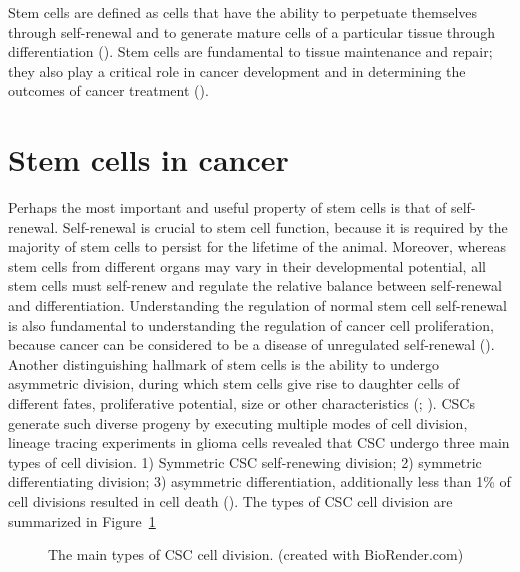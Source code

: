 \documentclass[
  letterpaper,
]{scrreprt}
\theoremstyle{definition}
\theoremstyle{remark}
\begin{document}
Stem cells are defined as cells that have the ability to perpetuate
themselves through self-renewal and to generate mature cells of a
particular tissue through differentiation (). Stem cells are fundamental to tissue maintenance and
repair; they also play a critical role in cancer development and in
determining the outcomes of cancer treatment
().

\section{Stem cells in cancer}\label{sec-stem-cells-in-cancer}

Perhaps the most important and useful property of stem cells is that of
self-renewal. Self-renewal is crucial to stem cell function, because it
is required by the majority of stem cells to persist for the lifetime of
the animal. Moreover, whereas stem cells from different organs may vary
in their developmental potential, all stem cells must self-renew and
regulate the relative balance between self-renewal and differentiation.
Understanding the regulation of normal stem cell self-renewal is also
fundamental to understanding the regulation of cancer cell
proliferation, because cancer can be considered to be a disease of
unregulated self-renewal ().
Another distinguishing hallmark of stem cells is the ability to undergo
asymmetric division, during which stem cells give rise to daughter cells
of different fates, proliferative potential, size or other
characteristics (;
). CSCs generate such
diverse progeny by executing multiple modes of cell division, lineage
tracing experiments in glioma cells revealed that CSC undergo three main
types of cell division. 1) Symmetric CSC self-renewing division; 2)
symmetric differentiating division; 3) asymmetric differentiation,
additionally less than 1\% of cell divisions resulted in cell death
(). The types of CSC cell
division are summarized in Figure~\ref{fig-types-csc-div}

\begin{figure}


\caption{\label{fig-types-csc-div}The main types of CSC cell division.
(created with BioRender.com)}

\end{figure}%
\end{document}
